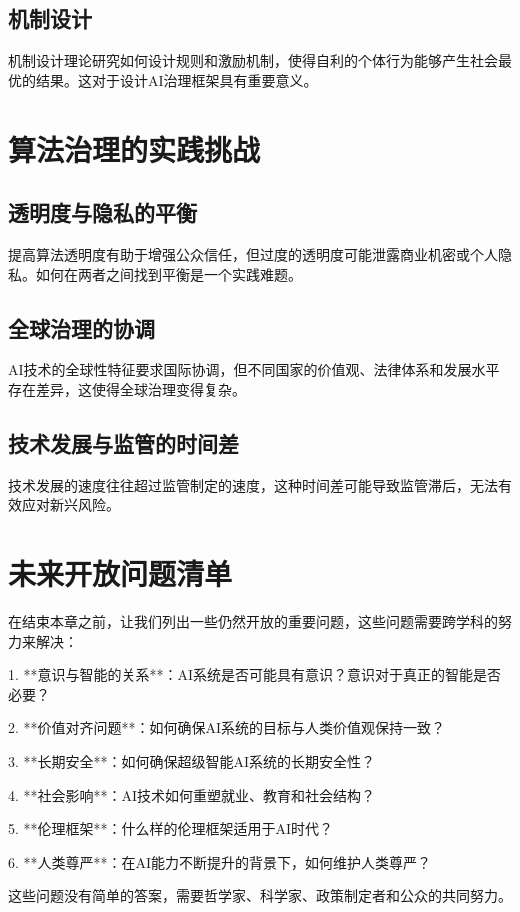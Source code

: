 \subsection{机制设计}
机制设计理论研究如何设计规则和激励机制，使得自利的个体行为能够产生社会最优的结果。这对于设计AI治理框架具有重要意义。

\section{算法治理的实践挑战}

\subsection{透明度与隐私的平衡}
提高算法透明度有助于增强公众信任，但过度的透明度可能泄露商业机密或个人隐私。如何在两者之间找到平衡是一个实践难题。

\subsection{全球治理的协调}
AI技术的全球性特征要求国际协调，但不同国家的价值观、法律体系和发展水平存在差异，这使得全球治理变得复杂。

\subsection{技术发展与监管的时间差}
技术发展的速度往往超过监管制定的速度，这种时间差可能导致监管滞后，无法有效应对新兴风险。

\section{未来开放问题清单}

在结束本章之前，让我们列出一些仍然开放的重要问题，这些问题需要跨学科的努力来解决：

1. **意识与智能的关系**：AI系统是否可能具有意识？意识对于真正的智能是否必要？

2. **价值对齐问题**：如何确保AI系统的目标与人类价值观保持一致？

3. **长期安全**：如何确保超级智能AI系统的长期安全性？

4. **社会影响**：AI技术如何重塑就业、教育和社会结构？

5. **伦理框架**：什么样的伦理框架适用于AI时代？

6. **人类尊严**：在AI能力不断提升的背景下，如何维护人类尊严？

这些问题没有简单的答案，需要哲学家、科学家、政策制定者和公众的共同努力。

